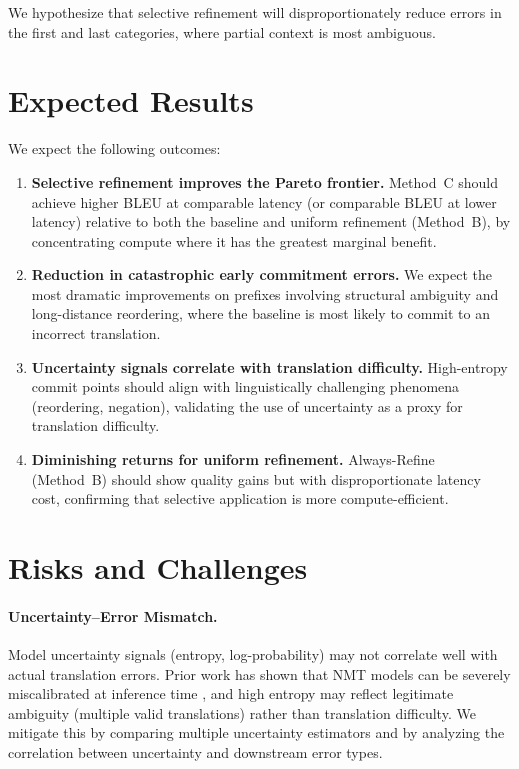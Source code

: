 We hypothesize that selective refinement will disproportionately reduce errors in the first and last categories, where partial context is most ambiguous.


\section{Expected Results}

We expect the following outcomes:

\begin{enumerate}[leftmargin=*, itemsep=4pt]
    \item \textbf{Selective refinement improves the Pareto frontier.} Method~C should achieve higher BLEU at comparable latency (or comparable BLEU at lower latency) relative to both the baseline and uniform refinement (Method~B), by concentrating compute where it has the greatest marginal benefit.

    \item \textbf{Reduction in catastrophic early commitment errors.} We expect the most dramatic improvements on prefixes involving structural ambiguity and long-distance reordering, where the baseline is most likely to commit to an incorrect translation.

    \item \textbf{Uncertainty signals correlate with translation difficulty.} High-entropy commit points should align with linguistically challenging phenomena (reordering, negation), validating the use of uncertainty as a proxy for translation difficulty.

    \item \textbf{Diminishing returns for uniform refinement.} Always-Refine (Method~B) should show quality gains but with disproportionate latency cost, confirming that selective application is more compute-efficient.
\end{enumerate}


\section{Risks and Challenges}

\paragraph{Uncertainty--Error Mismatch.} Model uncertainty signals (entropy, log-probability) may not correlate well with actual translation errors. Prior work has shown that NMT models can be severely miscalibrated at inference time \citep{wang2020calibration}, and high entropy may reflect legitimate ambiguity (multiple valid translations) rather than translation difficulty. We mitigate this by comparing multiple uncertainty estimators and by analyzing the correlation between uncertainty and downstream error types.

